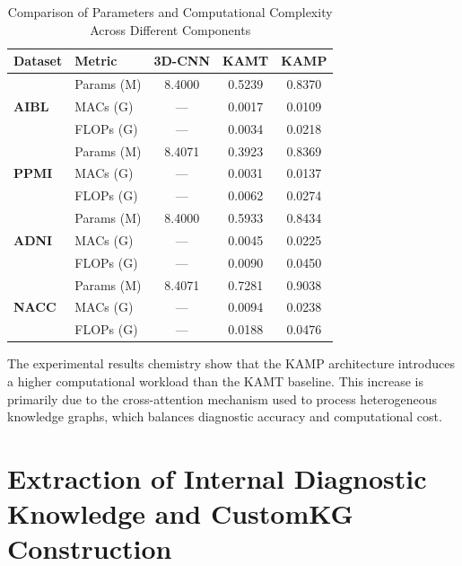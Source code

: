 \documentclass[sn-mathphys-num]{sn-jnl}%
\theoremstyle{thmstyleone}%
\theoremstyle{thmstyletwo}%
\theoremstyle{thmstylethree}%
\begin{document}
\begin{table}[!htb]
\renewcommand{\arraystretch}{1.3} %
\centering
\caption{Comparison of Parameters and Computational Complexity Across Different Components}
\label{tab:computational_loss}
\begin{tabular}{llccc}
\hline
\textbf{Dataset} & \textbf{Metric} & \textbf{3D-CNN} & \textbf{KAMT} & \textbf{KAMP} \\
\hline
\multirow{3}{*}{\textbf{AIBL}}  & Params (M) & 8.4000 & 0.5239 & 0.8370 \\
                                & MACs (G)   & —      & 0.0017 & 0.0109 \\
                                & FLOPs (G)  & —      & 0.0034 & 0.0218 \\
\hline
\multirow{3}{*}{\textbf{PPMI}}  & Params (M) & 8.4071 & 0.3923 & 0.8369 \\
                                & MACs (G)   & —      & 0.0031 & 0.0137 \\
                                & FLOPs (G)  & —      & 0.0062 & 0.0274 \\
\hline
\multirow{3}{*}{\textbf{ADNI}}  & Params (M) & 8.4000 & 0.5933 & 0.8434 \\
                                & MACs (G)   & —      & 0.0045 & 0.0225 \\
                                & FLOPs (G)  & —      & 0.0090 & 0.0450 \\
\hline
\multirow{3}{*}{\textbf{NACC}}  & Params (M) & 8.4071 & 0.7281 & 0.9038 \\
                                & MACs (G)   & —      & 0.0094 & 0.0238 \\
                                & FLOPs (G)  & —      & 0.0188 & 0.0476 \\
\hline
\end{tabular}
\end{table}

The experimental results chemistry show that the KAMP architecture introduces a higher computational workload than the KAMT baseline. This increase is primarily due to the cross-attention mechanism used to process heterogeneous knowledge graphs, which balances diagnostic accuracy and computational cost.


\section{Extraction of Internal Diagnostic Knowledge and CustomKG Construction}
\end{document}
